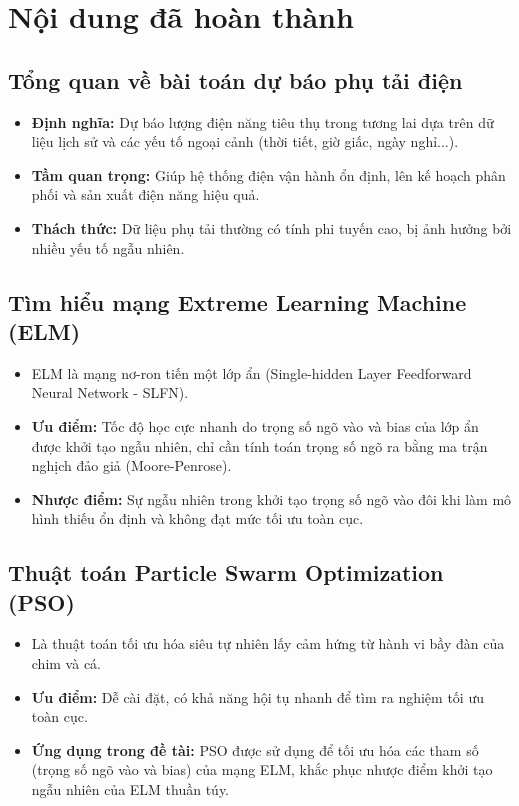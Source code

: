 \documentclass[12pt,a4paper]{article}
\begin{document}
\section{Nội dung đã hoàn thành}

\subsection{Tổng quan về bài toán dự báo phụ tải điện}
\begin{itemize}
    \item \textbf{Định nghĩa:} Dự báo lượng điện năng tiêu thụ trong tương lai dựa trên dữ liệu lịch sử và các yếu tố ngoại cảnh (thời tiết, giờ giấc, ngày nghỉ...).
    \item \textbf{Tầm quan trọng:} Giúp hệ thống điện vận hành ổn định, lên kế hoạch phân phối và sản xuất điện năng hiệu quả.
    \item \textbf{Thách thức:} Dữ liệu phụ tải thường có tính phi tuyến cao, bị ảnh hưởng bởi nhiều yếu tố ngẫu nhiên.
\end{itemize}

\subsection{Tìm hiểu mạng Extreme Learning Machine (ELM)}
\begin{itemize}
    \item ELM là mạng nơ-ron tiến một lớp ẩn (Single-hidden Layer Feedforward Neural Network - SLFN).
    \item \textbf{Ưu điểm:} Tốc độ học cực nhanh do trọng số ngõ vào và bias của lớp ẩn được khởi tạo ngẫu nhiên, chỉ cần tính toán trọng số ngõ ra bằng ma trận nghịch đảo giả (Moore-Penrose).
    \item \textbf{Nhược điểm:} Sự ngẫu nhiên trong khởi tạo trọng số ngõ vào đôi khi làm mô hình thiếu ổn định và không đạt mức tối ưu toàn cục.
\end{itemize}

\subsection{Thuật toán Particle Swarm Optimization (PSO)}
\begin{itemize}
    \item Là thuật toán tối ưu hóa siêu tự nhiên lấy cảm hứng từ hành vi bầy đàn của chim và cá.
    \item \textbf{Ưu điểm:} Dễ cài đặt, có khả năng hội tụ nhanh để tìm ra nghiệm tối ưu toàn cục.
    \item \textbf{Ứng dụng trong đề tài:} PSO được sử dụng để tối ưu hóa các tham số (trọng số ngõ vào và bias) của mạng ELM, khắc phục nhược điểm khởi tạo ngẫu nhiên của ELM thuần túy.
\end{itemize}
\end{document}
